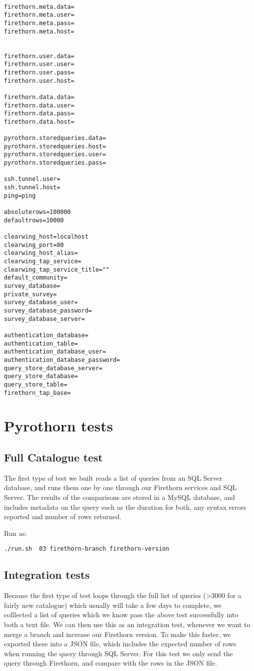 \documentclass[review,5p,authoryear,12pt]{elsarticle}
\begin{document}
\begin{verbatim}

firethorn.meta.data=
firethorn.meta.user=
firethorn.meta.pass=
firethorn.meta.host=


firethorn.user.data=
firethorn.user.user=
firethorn.user.pass=
firethorn.user.host=

firethorn.data.data=
firethorn.data.user=
firethorn.data.pass=
firethorn.data.host=

pyrothorn.storedqueries.data=
pyrothorn.storedqueries.host=
pyrothorn.storedqueries.user=
pyrothorn.storedqueries.pass=

ssh.tunnel.user=
ssh.tunnel.host=
ping=ping

absoluterows=100000
defaultrows=10000

clearwing_host=localhost
clearwing_port=80
clearwing_host_alias=
clearwing_tap_service=
clearwing_tap_service_title=""
default_community=
survey_database=
private_survey=
survey_database_user=
survey_database_password=
survey_database_server=

authentication_database=
authentication_table=
authentication_database_user=
authentication_database_password=
query_store_database_server=
query_store_database=
query_store_table=
firethorn_tap_base=

\end{verbatim}




\section{Pyrothorn tests}
\label{sec:Pyrothorn tests}
	
\subsection{Full Catalogue test}
The first type of test we built reads a list of queries from an SQL Server database, and runs them one by one through our Firethorn services and SQL Server. The results of the comparisons are stored in a MySQL database, and includes metadata on the query such as the duration for both, any syntax errors reported and number of rows returned.

Run as: 
\begin{verbatim}
./run.sh  03 firethorn-branch firethorn-version
\end{verbatim}

\subsection{Integration tests}
Because the first type of test loops through the full list of queries (>3000 for a fairly new catalogue) which usually will take a few days to complete, we colllected a list of queries which we know pass the above test successfully into both a text file. We can then use this as an integration test, whenever we want to merge a branch and increase our Firethorn version. To make this faster, we exported these into a JSON file, which includes the expected number of rows when running the query through SQL Server. For this test we only send the query through Firethorn, and compare with the rows in the JSON file.
\end{document}
